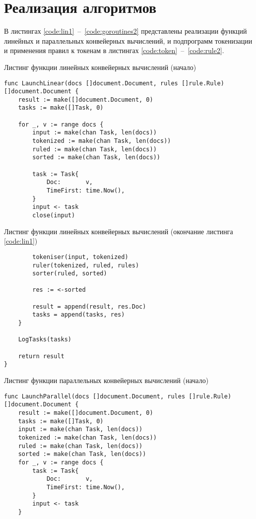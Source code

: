 \section{Реализация алгоритмов}
В листингах \ref{code:lin1}~--~\ref{code:goroutines2} представлены реализации функций линейных и параллельных конвейерных вычислений, и подпрограмм токенизации и применения правил к токенам в листингах \ref{code:token}~--~\ref{code:rule2}. 

\begin{code}
\caption{Листинг функции линейных конвейерных вычислений (начало)}
\label{code:lin1}
\begin{verbatim}
func LaunchLinear(docs []document.Document, rules []rule.Rule) 
[]document.Document {
	result := make([]document.Document, 0)
	tasks := make([]Task, 0)

	for _, v := range docs {
		input := make(chan Task, len(docs))
		tokenized := make(chan Task, len(docs))
		ruled := make(chan Task, len(docs))
		sorted := make(chan Task, len(docs))

		task := Task{
			Doc:       v,
			TimeFirst: time.Now(),
		}
		input <- task
		close(input)
\end{verbatim}
\end{code}

\newpage

\begin{code}
\caption{Листинг функции линейных конвейерных вычислений (окончание листинга \ref{code:lin1})}
\label{code:lin2}
\begin{verbatim}
		tokeniser(input, tokenized)
		ruler(tokenized, ruled, rules)
		sorter(ruled, sorted)

		res := <-sorted

		result = append(result, res.Doc)
		tasks = append(tasks, res)
	}

	LogTasks(tasks)

	return result
}
\end{verbatim}
\end{code}

\begin{code}
\caption{Листинг функции параллельных конвейерных вычислений (начало)}
\label{code:par1}
\begin{verbatim}
func LaunchParallel(docs []document.Document, rules []rule.Rule) 
[]document.Document {
	result := make([]document.Document, 0)
	tasks := make([]Task, 0)
	input := make(chan Task, len(docs))
	tokenized := make(chan Task, len(docs))
	ruled := make(chan Task, len(docs))
	sorted := make(chan Task, len(docs))
	for _, v := range docs {
		task := Task{
			Doc:       v,
			TimeFirst: time.Now(),
		}
		input <- task
	}
\end{verbatim}
\end{code}

